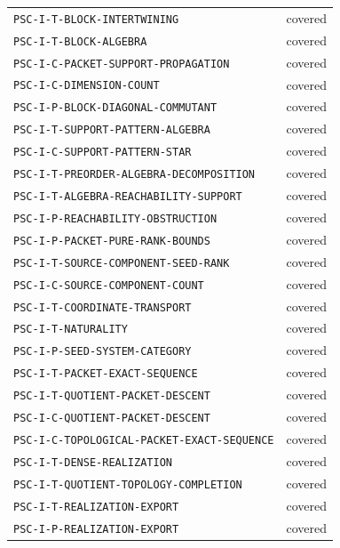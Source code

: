{\begin{longtable}{p{}p{}}
\nolinkurl{PSC-I-T-BLOCK-INTERTWINING} & covered \\
\nolinkurl{PSC-I-T-BLOCK-ALGEBRA} & covered \\
\nolinkurl{PSC-I-C-PACKET-SUPPORT-PROPAGATION} & covered \\
\nolinkurl{PSC-I-C-DIMENSION-COUNT} & covered \\
\nolinkurl{PSC-I-P-BLOCK-DIAGONAL-COMMUTANT} & covered \\
\nolinkurl{PSC-I-T-SUPPORT-PATTERN-ALGEBRA} & covered \\
\nolinkurl{PSC-I-C-SUPPORT-PATTERN-STAR} & covered \\
\nolinkurl{PSC-I-T-PREORDER-ALGEBRA-DECOMPOSITION} & covered \\
\nolinkurl{PSC-I-T-ALGEBRA-REACHABILITY-SUPPORT} & covered \\
\nolinkurl{PSC-I-P-REACHABILITY-OBSTRUCTION} & covered \\
\nolinkurl{PSC-I-P-PACKET-PURE-RANK-BOUNDS} & covered \\
\nolinkurl{PSC-I-T-SOURCE-COMPONENT-SEED-RANK} & covered \\
\nolinkurl{PSC-I-C-SOURCE-COMPONENT-COUNT} & covered \\
\nolinkurl{PSC-I-T-COORDINATE-TRANSPORT} & covered \\
\nolinkurl{PSC-I-T-NATURALITY} & covered \\
\nolinkurl{PSC-I-P-SEED-SYSTEM-CATEGORY} & covered \\
\nolinkurl{PSC-I-T-PACKET-EXACT-SEQUENCE} & covered \\
\nolinkurl{PSC-I-T-QUOTIENT-PACKET-DESCENT} & covered \\
\nolinkurl{PSC-I-C-QUOTIENT-PACKET-DESCENT} & covered \\
\nolinkurl{PSC-I-C-TOPOLOGICAL-PACKET-EXACT-SEQUENCE} & covered \\
\nolinkurl{PSC-I-T-DENSE-REALIZATION} & covered \\
\nolinkurl{PSC-I-T-QUOTIENT-TOPOLOGY-COMPLETION} & covered \\
\nolinkurl{PSC-I-T-REALIZATION-EXPORT} & covered \\
\nolinkurl{PSC-I-P-REALIZATION-EXPORT} & covered \\
\bottomrule\end{longtable}}
